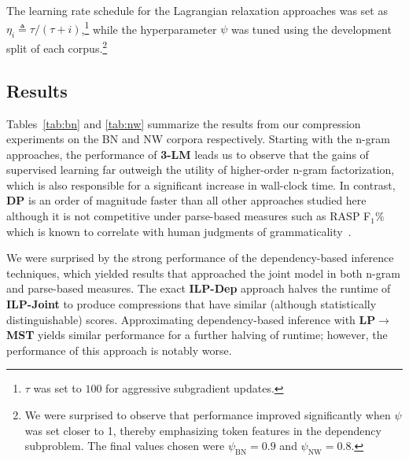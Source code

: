 \documentclass[11pt,a4paper]{article}
\begin{document}
The learning rate schedule for the Lagrangian relaxation approaches
was set as $\eta_i \triangleq \tau/(\tau + i)$,\footnote{
    $\tau$ was set to $100$ for aggressive subgradient updates.}
while the hyperparameter $\psi$ was tuned using the development
split of each corpus.\footnote{We were surprised to observe that
    performance improved significantly when $\psi$ was set
    closer to 1, thereby emphasizing token features in the
    dependency subproblem. The final values chosen were
    $\psi_\text{BN} = 0.9$ and $\psi_\text{NW}=0.8$.
}

\subsection{Results}
\label{fixed}
Tables~\ref{tab:bn} and \ref{tab:nw} summarize
the results from our compression experiments on the BN and NW corpora
respectively.
Starting with the n-gram approaches, the performance of \textbf{3-LM}
leads us to observe that the gains of supervised learning far outweigh
the utility of higher-order
n-gram factorization, which is also responsible for a significant
increase in wall-clock time.
In contrast, \textbf{DP}
is an order of magnitude faster than all other approaches
studied here %
although it is not
competitive under parse-based measures such as RASP F$_1\%$ which is known
to correlate with human judgments of grammaticality~\cite{clarke06a}.

We were surprised by the strong performance of the dependency-based
inference techniques, which yielded results that approached the
joint model in both n-gram and parse-based measures. The exact
\textbf{ILP-Dep} approach halves the runtime of \textbf{ILP-Joint}
to produce compressions that have similar (although statistically
distinguishable) scores.
Approximating dependency-based inference with \textbf{LP$\rightarrow$MST}
yields similar performance for a further halving of runtime;
however, the performance of this approach is notably worse.
\end{document}
